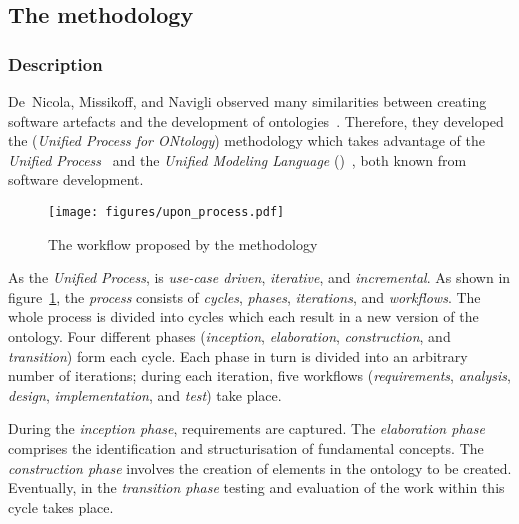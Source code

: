 \subsection{The  methodology}
\label{subsec:approach2}

\subsubsection{Description}

De~Nicola, Missikoff, and Navigli observed many similarities between creating software artefacts and the development of ontologies~\cite{SoftwareEngineeringOntology}. Therefore, they developed the  (\emph{Unified Process for ONtology}) methodology which takes advantage of the \emph{Unified Process}~\cite{UnifiedProcess} and the \emph{Unified Modeling Language} ()~\cite{UML}, both known from software development.

\begin{figure}
\centering
\texttt{[image: figures/upon\_process.pdf]}
\caption{The workflow proposed by the  methodology~\cite{SoftwareEngineeringOntology}}
\label{fig:upon_process}
\end{figure}

As the \emph{Unified Process},  is \emph{use-case driven}, \emph{iterative}, and \emph{incremental}. As shown in figure~\ref{fig:upon_process}, the  \emph{process} consists of \emph{cycles}, \emph{phases}, \emph{iterations}, and \emph{workflows}. The whole process is divided into cycles which each result in a new version of the ontology. Four different phases (\emph{inception}, \emph{elaboration}, \emph{construction}, and \emph{transition}) form each cycle. Each phase in turn is divided into an arbitrary number of iterations; during each iteration, five workflows (\emph{requirements}, \emph{analysis}, \emph{design}, \emph{implementation}, and \emph{test}) take place.

During the \emph{inception phase}, requirements are captured. The \emph{elaboration phase} comprises the identification and structurisation of fundamental concepts. The \emph{construction phase} involves the creation of elements in the ontology to be created. Eventually, in the \emph{transition phase} testing and evaluation of the work within this cycle takes place.

